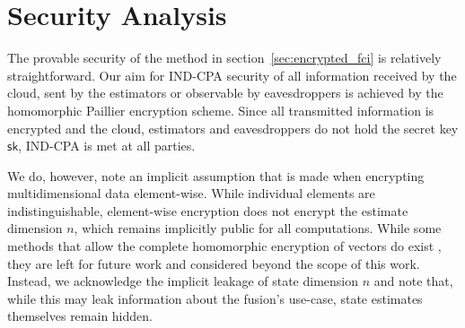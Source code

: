 \documentclass[letterpaper, 10 pt, conference]{ieeeconf}
\begin{document}
\section{Security Analysis}\label{sec:security}
The provable security of the method in section~\ref{sec:encrypted_fci} is relatively straightforward. Our aim for IND-CPA security of all information received by the cloud, sent by the estimators or observable by eavesdroppers is achieved by the homomorphic Paillier encryption scheme. Since all transmitted information is encrypted and the cloud, estimators and eavesdroppers do not hold the secret key $\mathsf{sk}$, IND-CPA is met at all parties.

We do, however, note an implicit assumption that is made when encrypting multidimensional data element-wise. While individual elements are indistinguishable, element-wise encryption does not encrypt the estimate dimension $n$, which remains implicitly public for all computations. While some methods that allow the complete homomorphic encryption of vectors do exist \cite{alexandruPrivateWeightedSum2020}, they are left for future work and considered beyond the scope of this work. Instead, we acknowledge the implicit leakage of state dimension $n$ and note that, while this may leak information about the fusion's use-case, state estimates themselves remain hidden.

% 
%                                 
%                                 
%                                 
% 
\end{document}
